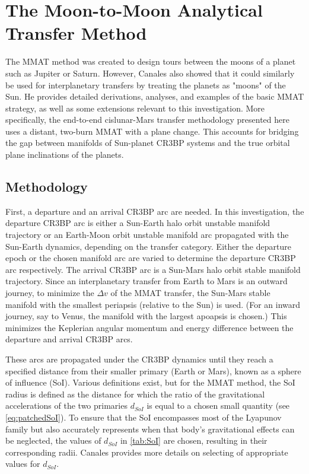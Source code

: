 \section{The Moon-to-Moon Analytical Transfer Method}
The MMAT method was created to design tours between the moons of a planet such as Jupiter or
Saturn. However, Canales also showed that it could similarly be used for interplanetary transfers
by treating the planets as "moons" of the Sun. He provides detailed derivations, analyses, and
examples of the basic MMAT strategy, as well as some extensions relevant to this
investigation\cite{Canales:2021a,Canales:2021b,Canales:2022}. More specifically, the end-to-end
cislunar-Mars transfer methodology presented here uses a distant, two-burn MMAT with a plane
change. This accounts for bridging the gap between manifolds of Sun-planet CR3BP systems and the
true orbital plane inclinations of the planets.

\subsection{Methodology}
First, a departure and an arrival CR3BP arc are needed. In this investigation, the departure CR3BP
arc is either a Sun-Earth halo orbit unstable manifold trajectory or an Earth-Moon orbit unstable
manifold arc propagated with the Sun-Earth dynamics, depending on the transfer category. Either the
departure epoch or the chosen manifold arc are varied to determine the departure CR3BP arc
respectively. The arrival CR3BP arc is a Sun-Mars halo orbit stable manifold trajectory. Since an
interplanetary transfer from Earth to Mars is an outward journey, to minimize the $\Delta v$ of the
MMAT transfer, the Sun-Mars stable manifold with the smallest periapsis (relative to the Sun) is
used\cite{Canales:2021b}. (For an inward journey, say to Venus, the manifold with the largest
apoapsis is chosen.) This minimizes the Keplerian angular momentum and energy difference between
the departure and arrival CR3BP arcs.

These arcs are propagated under the CR3BP dynamics until they reach a specified distance from their
smaller primary (Earth or Mars), known as a sphere of influence (SoI). Various definitions exist,
but for the MMAT method, the SoI radius is defined as the distance for which the ratio of the
gravitational accelerations of the two primaries $d_{SoI}$ is equal to a chosen small
quantity (see \cref{eq:patchedSoI})\cite{Canales:2021b}. To ensure that the SoI encompasses most of the Lyapunov family but
also accurately represents when that body's gravitational effects can be neglected, the values of
$d_{SoI}$ in \cref{tab:SoI} are chosen, resulting in their corresponding radii. Canales provides
more details on selecting of appropriate values for $d_{SoI}$\cite{Canales:2021b}.

